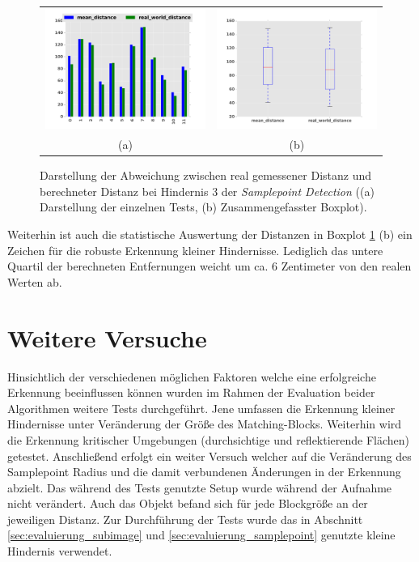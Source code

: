 \begin{figure}[h]
	\centering
	\begin{tabular}{cc}
	\includegraphics[width=7cm]{img/evaluation/diagrams/sample_tiny_bar}&
	\includegraphics[width=7cm]{img/evaluation/diagrams/sample_tiny_box}\\
	 (a) & (b)
	\end{tabular}
	\caption{Darstellung der Abweichung zwischen real gemessener Distanz und berechneter Distanz bei Hindernis 3 der \emph{Samplepoint Detection} ((a) Darstellung der einzelnen Tests, (b) Zusammengefasster Boxplot).}
    \label{fig:sample_eval_tiny}
\end{figure}

\noindent
Weiterhin ist auch die statistische Auswertung der Distanzen in Boxplot \ref{fig:sample_eval_tiny} (b) ein Zeichen für die robuste Erkennung kleiner Hindernisse. Lediglich das untere Quartil der berechneten Entfernungen weicht um ca. 6 Zentimeter von den realen Werten ab.

\section{Weitere Versuche}
\label{sec:further_tests}

Hinsichtlich der verschiedenen möglichen Faktoren welche eine erfolgreiche Erkennung beeinflussen können wurden im Rahmen der Evaluation beider Algorithmen weitere Tests durchgeführt. Jene umfassen die Erkennung kleiner Hindernisse unter Veränderung der Größe des Matching-Blocks. Weiterhin wird die Erkennung kritischer Umgebungen (durchsichtige und  reflektierende Flächen) getestet. Anschließend erfolgt ein weiter Versuch welcher auf die Veränderung des Samplepoint Radius und die damit verbundenen Änderungen in der Erkennung abzielt. Das während des Tests genutzte Setup wurde während der Aufnahme nicht verändert. Auch das Objekt befand sich für jede Blockgröße an der jeweiligen Distanz. Zur Durchführung der Tests wurde das in Abschnitt \ref{sec:evaluierung_subimage} und \ref{sec:evaluierung_samplepoint} genutzte kleine Hindernis verwendet.

